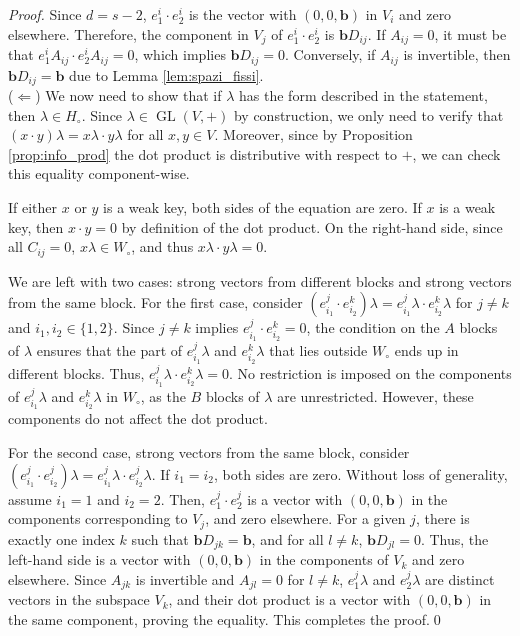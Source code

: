 \documentclass[runningheads,a4paper,english]{llncs}
\DeclareMathOperator{\gl}{GL}
\renewcommand{\b}{\textbf{b}}
\newcommand{\wo}{W_\circ}
\newcommand{\ho}{H_\circ}
\begin{document}
\begin{proof}
Since \( d = s-2 \), \( e^i_1 \cdot e^i_2 \) is the vector with \((0, 0, \b)\) in \( V_i \) and zero elsewhere. Therefore, the component in \( V_j \) of \( e^i_1 \cdot e^i_2 \) is \( \b D_{ij} \). If \( A_{ij} = 0 \), it must be that \( e^i_1 A_{ij} \cdot e^i_2 A_{ij} = 0 \), which implies \( \b D_{ij} = 0 \). Conversely, if \( A_{ij} \) is invertible, then \( \b D_{ij} = \b \) due to Lemma \ref{lem:spazi_fissi}.\\


\noindent(\(\Leftarrow\)) We now need to show that if \( \lambda \) has the form described in the statement, then \( \lambda \in \ho\). Since \( \lambda \in \gl(V,+) \) by construction, we only need to verify that \( (x \cdot y)\lambda = x\lambda \cdot y\lambda \) for all \( x, y \in V \). Moreover, since by Proposition \ref{prop:info_prod} the dot product is distributive with respect to \( + \), we can check this equality component-wise.

If either \( x \) or \( y \) is a weak key, both sides of the equation are zero. If \( x \) is a weak key, then \( x \cdot y = 0 \) by definition of the dot product. On the right-hand side, since all \( C_{ij} = 0 \), \( x\lambda \in \wo \), and thus \( x\lambda \cdot y\lambda = 0 \).

We are left with two cases: strong vectors from different blocks and strong vectors from the same block. For the first case, consider \( (e^j_{i_1} \cdot e^k_{i_2})\lambda = e^j_{i_1} \lambda \cdot e^k_{i_2} \lambda \) for \( j \neq k \) and \( i_1, i_2 \in \{1, 2\} \). Since \( j \neq k \) implies \( e^j_{i_1} \cdot e^k_{i_2} = 0 \), the condition on the \( A \) blocks of \( \lambda \) ensures that the part of \( e^j_{i_1} \lambda \) and \( e^k_{i_2}\lambda \) that lies outside \( \wo \) ends up in different blocks. Thus, \( e^j_{i_1} \lambda \cdot e^k_{i_2}\lambda = 0 \). No restriction is imposed on the components of \( e^j_{i_1} \lambda \) and \( e^k_{i_2}\lambda \) in \( \wo \), as the \( B \) blocks of \( \lambda \) are unrestricted. However, these components do not affect the dot product.

For the second case, strong vectors from the same block, consider \( (e^j_{i_1} \cdot e^j_{i_2})\lambda = e^j_{i_1} \lambda \cdot e^j_{i_2} \lambda \). If \( i_1 = i_2 \), both sides are zero. Without loss of generality, assume \( i_1 = 1 \) and \( i_2 = 2 \). Then, \( e_1^j \cdot e_2^j \) is a vector with \( (0, 0, \b) \) in the components corresponding to \( V_j \), and zero elsewhere. For a given \( j \), there is exactly one index \( k \) such that \( \b D_{jk} = \b \), and for all \( l \neq k \), \( \b D_{jl} = 0 \). Thus, the left-hand side is a vector with \( (0, 0, \b) \) in the components of \( V_k \) and zero elsewhere. Since \( A_{jk} \) is invertible and \( A_{jl} = 0 \) for \( l \neq k \), \( e_1^j \lambda \) and \( e_2^j \lambda \) are distinct vectors in the subspace \( V_k \), and their dot product is a vector with \( (0, 0, \b) \) in the same component, proving the equality. This completes the proof.\qed

\end{proof}
\end{document}
